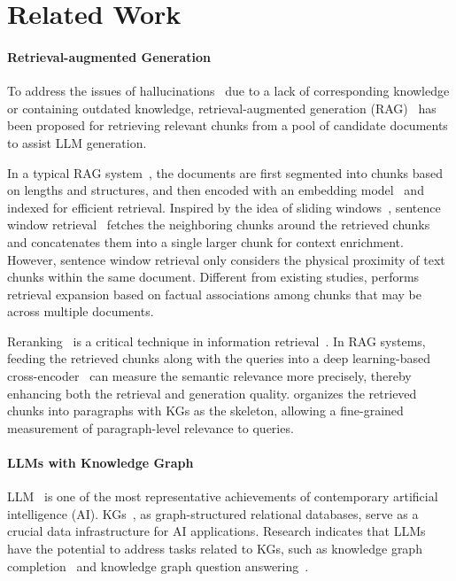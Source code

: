 \section{Related Work}

\paragraph{Retrieval-augmented Generation}
To address the issues of hallucinations~\cite{xu24hallucinationsurvey,liu24hallucinationsurvey} due to a lack of corresponding knowledge or containing outdated knowledge, retrieval-augmented generation (RAG)~\cite{gao23ragsurvey,fan24ragsurvey} has been proposed for retrieving relevant chunks from a pool of candidate documents to assist LLM generation.

In a typical RAG system~\cite{patrick20rag}, the documents are first segmented into chunks based on lengths and structures, and then encoded with an embedding model~\cite{zach24nomic,li24mxbai} and indexed for efficient retrieval.
Inspired by the idea of sliding windows~\cite{jiao06slidingwindows}, sentence window retrieval~\cite{jiang23arag,matous24aragog} fetches the neighboring chunks around the retrieved chunks and concatenates them into a single larger chunk for context enrichment.
However, sentence window retrieval only considers the physical proximity of text chunks within the same document.
Different from existing studies, \modelname performs retrieval expansion based on factual associations among chunks that may be across multiple documents.

Reranking~\cite{nicholas24improving,michael22re2g} is a critical technique in information retrieval~\cite{mandalay62irsurvey,kuo24irsurvey}. In RAG systems, feeding the retrieved chunks along with the queries into a deep learning-based cross-encoder~\cite{xiao23cpack} can measure the semantic relevance more precisely, thereby enhancing both the retrieval and generation quality.
\modelname organizes the retrieved chunks into paragraphs with KGs as the skeleton, allowing a fine-grained measurement of paragraph-level relevance to queries.


\paragraph{LLMs with Knowledge Graph}
LLM~\cite{li24llmsurvey,ren24llmsurvey} is one of the most representative achievements of contemporary artificial intelligence (AI).
KGs~\cite{ji22kgsurvey}, as graph-structured relational databases, serve as a crucial data infrastructure for AI applications.
Research indicates that LLMs have the potential to address tasks related to KGs, such as knowledge graph completion~\cite{liu24finetuning} and knowledge graph question answering~\cite{sen23knowledge}.

